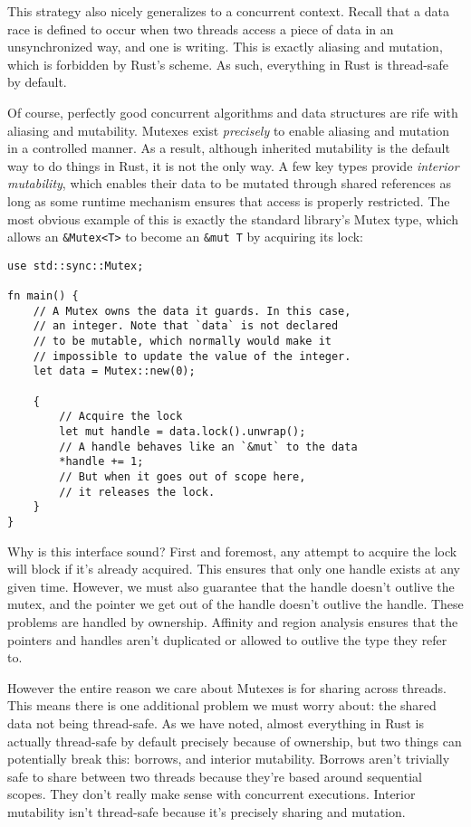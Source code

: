 This strategy also nicely generalizes to a concurrent context. Recall that a data race is
defined to occur when two threads access a piece of data in an unsynchronized
way, and one is writing. This is exactly aliasing and mutation, which is
forbidden by Rust's scheme. As such, everything in Rust is thread-safe by default.

Of course, perfectly good concurrent algorithms and data structures are rife with aliasing and
mutability. Mutexes exist \emph{precisely} to enable aliasing and mutation in a
controlled manner. As a result, although inherited mutability is the default way to do things in
Rust, it is not the only way. A few key types provide \emph{interior mutability},
which enables their data to be mutated through shared references as long as some
runtime mechanism ensures that access is properly restricted. The most
obvious example of this is exactly the standard library's Mutex type, which
allows an \texttt{&Mutex<T>} to become an \texttt{&mut T} by
acquiring its lock:

\begin{verbatim}
use std::sync::Mutex;

fn main() {
    // A Mutex owns the data it guards. In this case,
    // an integer. Note that `data` is not declared
    // to be mutable, which normally would make it
    // impossible to update the value of the integer.
    let data = Mutex::new(0);

    {
        // Acquire the lock
        let mut handle = data.lock().unwrap();
        // A handle behaves like an `&mut` to the data
        *handle += 1;
        // But when it goes out of scope here,
        // it releases the lock.
    }
}
\end{verbatim}

Why is this interface sound? First and foremost, any attempt to acquire the
lock will block if it's already acquired. This ensures that only one handle
exists at any given time. However, we must also guarantee that the handle doesn't
outlive the mutex, and the pointer we get out of the handle doesn't outlive the
handle. These problems are handled by ownership. Affinity and region analysis
ensures that the pointers and handles aren't duplicated or allowed to outlive
the type they refer to.

However the entire reason we care about Mutexes is for sharing across threads.
This means there is one additional problem we must worry about: the shared
data not being thread-safe. As we have noted, almost everything in Rust is
actually thread-safe by default precisely because of ownership, but two things
can potentially break this: borrows, and interior mutability. Borrows aren't
trivially safe to share between two threads because they're based around
sequential scopes. They don't really make sense with concurrent executions.
Interior mutability isn't thread-safe because it's precisely sharing and mutation.

